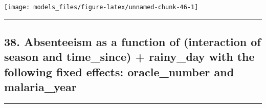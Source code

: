 \documentclass[]{article}
\begin{document}
\begin{center}\texttt{[image: models\_files/figure-latex/unnamed-chunk-46-1]} \end{center}

\newpage

\begin{center}\rule{0.5\linewidth}{\linethickness}\end{center}

\subsection{38. Absenteeism as a function of (interaction of season and
time\_since) + rainy\_day with the following fixed effects:
oracle\_number and
malaria\_year}\label{absenteeism-as-a-function-of-interaction-of-season-and-time_since-rainy_day-with-the-following-fixed-effects-oracle_number-and-malaria_year}

\begin{center}\rule{0.5\linewidth}{\linethickness}\end{center}
\end{document}

